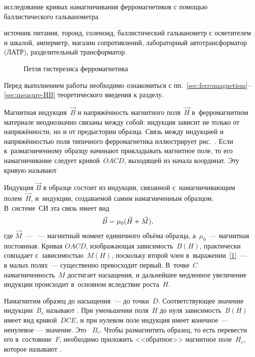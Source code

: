 
\begin{lab:aim}
	исследование кривых намагничивания ферромагнетиков с помощью баллистического гальванометра.
\end{lab:aim}

\begin{lab:equipment}
	источник питания, тороид, соленоид, баллистический гальванометр с осветителем и шкалой,
	амперметр, магазин сопротивлений, лабораторный автотрансформатор (ЛАТР), разделительный трансформатор.
\end{lab:equipment}


\begin{wrapfigure}[15]{r}{0.4\textwidth}
	\caption{Петля гистерезиса ферромагнетика}
\end{wrapfigure}

Перед выполнением работы необходимо ознакомиться с
пп.~\ref{sec:ferromagnetism}--\ref{sec:measure-HB} теоретического введения к разделу.

Магнитная индукция~$\vec{B}$ и напряжённость магнитного поля~$\vec{H}$ в~ферромагнитном материале неоднозначно связаны между
собой: индукция зависит не только от напряжённости, но и от предыстории образца. Связь между индукцией и напряжённостью
поля типичного ферромагнетика иллюстрирует рис.~. Если к~размагниченному образцу начинают прикладывать магнитное поле,
то его намагничивание следует кривой~$OACD$, выходящей из начала координат. Эту кривую называют 

Индукция $\vec{B}$ в образце состоит из индукции, связанной с~намагничивающим полем~$\vec{H}$, и~индукции, создаваемой самим
намагниченным образцом. В~системе~СИ эта связь имеет вид
\begin{equation}
	\eqmark{1}
	\vec{B}=\mu_0(\vec{H}+\vec{M}),
\end{equation}
где $\vec{M}$~--- ~--- магнитный момент единичного объёма образца, а~$\mu_0$~--- магнитная
постоянная. Кривая $OACD$, изображающая зависимость~$B(H)$, практически совпадает с~зависимостью~$M(H)$, поскольку
второй член в~выражении~\eqref{1}~--- в малых полях~--- существенно превосходит первый. В~точке~$C$ намагниченность~$M$
достигает насыщения, и дальнейшее медленное увеличение индукции происходит в~основном вследствие роста~$H$.

Намагнитим образец до насыщения~--- до точки~$D$. Соответствующее значение индукции~$B_s$ называют . При уменьшении поля~$H$ до нуля зависимость~$B(H)$ имеет вид кривой~$DCE$, и при нулевом поле индукция имеет
конечное~--- ненулевое --- значение. Это ~$B_r$. Чтобы размагнитить образец, то есть перевести
его в~состояние~$F$, необходимо приложить <<обратное>> магнитное поле~$H_c$, которое называют .

